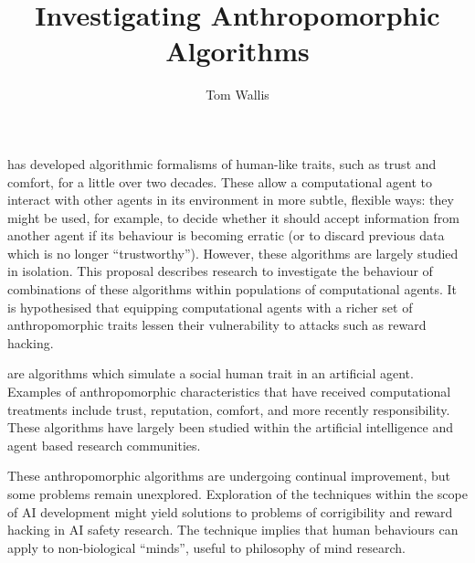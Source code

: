 

\author{Tom Wallis}
\title{Investigating Anthropomorphic Algorithms}
\date{}



\maketitle


 has developed algorithmic formalisms of human-like traits, such as trust and comfort, for a little over two decades. These allow a computational agent to interact with other agents in its environment in more subtle, flexible ways: they might be used, for example, to decide whether it should accept information from another agent if its behaviour is becoming erratic (or to discard previous data which is no longer ``trustworthy''). However, these algorithms are largely studied in isolation. This proposal describes research to investigate the behaviour of combinations of these algorithms within populations of computational agents. It is hypothesised that equipping computational agents with a richer set of anthropomorphic traits lessen their vulnerability to attacks such as reward hacking\cite{concrete_problems}.\par

 are algorithms which simulate a social human trait in an artificial agent. Examples of anthropomorphic characteristics that have received computational treatments include trust\cite{marsh1994,Castelfranchi}, reputation, comfort\cite{Marsh2011}, and more recently responsibility\cite{wallis_2017,sommerville_resp_depend}. These algorithms have largely been studied within the artificial intelligence and agent based research communities.\par

These anthropomorphic algorithms are undergoing continual improvement\cite{kramdi, Urbano2014}, but some problems remain unexplored. Exploration of the techniques within the scope of AI development might yield solutions to problems of corrigibility\cite{corrigibility} and reward hacking\cite{concrete_problems} in AI safety research. The technique implies that human behaviours can apply to non-biological ``minds'', useful to philosophy of mind research\cite{sloman_spaceofminds}.\par 

